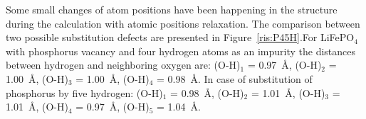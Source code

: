 Some small changes of atom positions have been happening in the structure during the calculation with atomic positions relaxation. The comparison between two possible substitution defects are presented in Figure~\ref{ris:P45H}.For LiFePO$_4$ with phosphorus vacancy and four hydrogen atoms as an impurity the distances between hydrogen and neighboring oxygen are: (O-H)$_{1}$ = 0.97{~\AA}, (O-H)$_{2}$ = 1.00{~\AA}, (O-H)$_{3}$ = 1.00{~\AA}, (O-H)$_{4}$ = 0.98{~\AA}. In case of substitution of phosphorus by five hydrogen: (O-H)$_{1}$ = 0.98{~\AA}, (O-H)$_{2}$ = 1.01{~\AA}, (O-H)$_{3}$ = 1.01{~\AA}, (O-H)$_{4}$ = 0.97{~\AA}, (O-H)$_{5}$ = 1.04{~\AA}.


\begin{figure}[h!]
\begin{minipage}[h]{0.49\linewidth}
\end{minipage}
\hfill
\begin{minipage}[h]{0.49\linewidth}

\end{minipage}
\end{figure}
